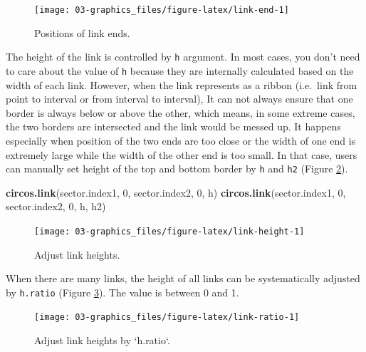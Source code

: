 \documentclass[]{book}
\newenvironment{Shaded}{\begin{snugshade}}{\end{snugshade}}
\newcommand{\KeywordTok}[1]{\textcolor[rgb]{0.13,0.29,0.53}{\textbf{#1}}}
\newcommand{\DecValTok}[1]{\textcolor[rgb]{0.00,0.00,0.81}{#1}}
\newcommand{\NormalTok}[1]{#1}
\theoremstyle{definition}
\theoremstyle{definition}
\theoremstyle{remark}
\begin{document}
\begin{figure}

{\centering \texttt{[image: 03-graphics\_files/figure-latex/link-end-1]} 

}

\caption{Positions of link ends.}\label{fig:link-end}
\end{figure}

The height of the link is controlled by \texttt{h} argument. In most
cases, you don't need to care about the value of \texttt{h} because they
are internally calculated based on the width of each link. However, when
the link represents as a ribbon (i.e.~link from point to interval or
from interval to interval), It can not always ensure that one border is
always below or above the other, which means, in some extreme cases, the
two borders are intersected and the link would be messed up. It happens
especially when position of the two ends are too close or the width of
one end is extremely large while the width of the other end is too
small. In that case, users can manually set height of the top and bottom
border by \texttt{h} and \texttt{h2} (Figure \ref{fig:link-height}).

\begin{Shaded}
\begin{Highlighting}[]
\KeywordTok{circos.link}\NormalTok{(sector.index1, }\DecValTok{0}\NormalTok{, sector.index2, }\DecValTok{0}\NormalTok{, h)}
\KeywordTok{circos.link}\NormalTok{(sector.index1, }\DecValTok{0}\NormalTok{, sector.index2, }\DecValTok{0}\NormalTok{, h, h2)}
\end{Highlighting}
\end{Shaded}

\begin{figure}

{\centering \texttt{[image: 03-graphics\_files/figure-latex/link-height-1]} 

}

\caption{Adjust link heights.}\label{fig:link-height}
\end{figure}

When there are many links, the height of all links can be systematically
adjusted by \texttt{h.ratio} (Figure \ref{fig:link-ratio}). The value is
between 0 and 1.

\begin{figure}

{\centering \texttt{[image: 03-graphics\_files/figure-latex/link-ratio-1]} 

}

\caption{Adjust link heights by `h.ratio`.}\label{fig:link-ratio}
\end{figure}
\end{document}
